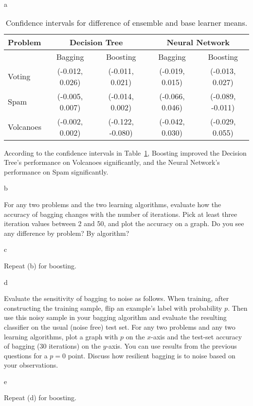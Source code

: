 \documentclass[fleqn]{homework}
\begin{document}
\begin{problem}{a}
    \begin{table}[h]
      \centering
      \caption{Confidence intervals for difference of ensemble and base learner means.}
      \label{t:a-ci}
      \begin{tabular}{lcccc}
        \toprule
        Problem   & \multicolumn{2}{c}{Decision Tree} & \multicolumn{2}{c}{Neural Network} \\
        \midrule
                  & Bagging         & Boosting        & Bagging         & Boosting \\
        Voting    & (-0.012, 0.026) & (-0.011, 0.021) & (-0.019, 0.015) & (-0.013, 0.027)\\
        Spam      & (-0.005, 0.007) & (-0.014, 0.002) & (-0.066, 0.046) & (-0.089, -0.011)\\
        Volcanoes & (-0.002, 0.002) & (-0.122, -0.080)& (-0.042, 0.030) & (-0.029, 0.055)\\
        \bottomrule
      \end{tabular}
    \end{table}

    According to the confidence intervals in Table~\ref{t:a-ci}, Boosting
    improved the Decision Tree's performance on Volcanoes significantly, and the
    Neural Network's performance on Spam significantly.
  \end{problem}

  \begin{problem}{b}
    \begin{question}
      For any two problems and the two learning algorithms, evaluate how the
      accuracy of bagging changes with the number of iterations. Pick at least
      three iteration values between 2 and 50, and plot the accuracy on a
      graph. Do you see any difference by problem? By algorithm?
    \end{question}
  \end{problem}

  \begin{problem}{c}
    \begin{question}
      Repeat (b) for boosting.
    \end{question}
  \end{problem}

  \begin{problem}{d}
    \begin{question}
      Evaluate the sensitivity of bagging to noise as follows. When training,
      after constructing the training sample, flip an example’s label with
      probability $p$. Then use this noisy sample in your bagging algorithm and
      evaluate the resulting classifier on the usual (noise free) test set. For
      any two problems and any two learning algorithms, plot a graph with $p$ on
      the $x$-axis and the test-set accuracy of bagging (30 iterations) on the
      $y$-axis. You can use results from the previous questions for a $p=0$
      point. Discuss how resilient bagging is to noise based on your
      observations.
    \end{question}
  \end{problem}

  \begin{problem}{e}
    \begin{question}
      Repeat (d) for boosting.
    \end{question}
  \end{problem}
\end{document}
